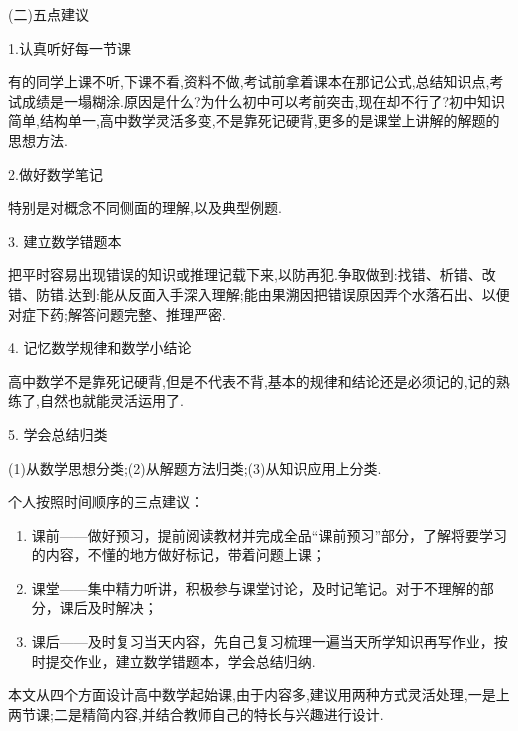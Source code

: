 (二)五点建议

1.认真听好每一节课

有的同学上课不听,下课不看,资料不做,考试前拿着课本在那记公式,总结知识点,考试成绩是一塌糊涂.原因是什么?为什么初中可以考前突击,现在却不行了?初中知识简单,结构单一,高中数学灵活多变,不是靠死记硬背,更多的是课堂上讲解的解题的思想方法.

2.做好数学笔记

特别是对概念不同侧面的理解,以及典型例题.

3. 建立数学错题本

把平时容易出现错误的知识或推理记载下来,以防再犯.争取做到:找错、析错、改错、防错.达到:能从反面入手深入理解;能由果溯因把错误原因弄个水落石出、以便对症下药;解答问题完整、推理严密.

4. 记忆数学规律和数学小结论

高中数学不是靠死记硬背,但是不代表不背,基本的规律和结论还是必须记的,记的熟练了,自然也就能灵活运用了.

5. 学会总结归类

(1)从数学思想分类;(2)从解题方法归类;(3)从知识应用上分类.

\begin{note}
	个人按照时间顺序的三点建议：
\begin{enumerate}
	\item     课前——做好预习，提前阅读教材并完成全品“课前预习”部分，了解将要学习的内容，不懂的地方做好标记，带着问题上课；
	\item 课堂——集中精力听讲，积极参与课堂讨论，及时记笔记。对于不理解的部分，课后及时解决；
	\item 课后——及时复习当天内容，先自己复习梳理一遍当天所学知识再写作业，按时提交作业，建立数学错题本，学会总结归纳.
\end{enumerate}
\end{note}

本文从四个方面设计高中数学起始课,由于内容多,建议用两种方式灵活处理,一是上两节课;二是精简内容,并结合教师自己的特长与兴趣进行设计.
